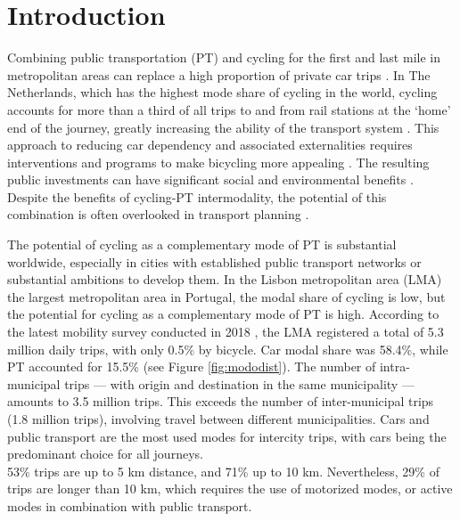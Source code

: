 \documentclass[review, doubleblind, 3p,
authoryear]{elsarticle} %
\begin{document}
\hypersetup{citecolor=black}

\section{Introduction}\label{introduction}

Combining public transportation (PT) and cycling for the first and last
mile in metropolitan areas can replace a high proportion of private car
trips \citep{MARTENS2007326}. In The Netherlands, which has the highest
mode share of cycling in the world, cycling accounts for more than a
third of all trips to and from rail stations at the `home' end of the
journey, greatly increasing the ability of the transport system
\citep{RIETVELD200071}. This approach to reducing car dependency and
associated externalities requires interventions and programs to make
bicycling more appealing \citep{lapaix_role_2021}. The resulting public
investments can have significant social and environmental benefits
\citep{internationaltransportforum_integrating_2017}. Despite the
benefits of cycling-PT intermodality, the potential of this combination
is often overlooked in transport planning \citep{lapaix_role_2021}.

The potential of cycling as a complementary mode of PT is substantial
worldwide, especially in cities with established public transport
networks or substantial ambitions to develop them. In the Lisbon
metropolitan area (LMA) the largest metropolitan area in Portugal, the
modal share of cycling is low, but the potential for cycling as a
complementary mode of PT is high. According to the latest mobility
survey conducted in 2018 \citep{IMOB}, the LMA registered a total of 5.3
million daily trips, with only 0.5\% by bicycle. Car modal share was
58.4\%, while PT accounted for 15.5\% (see Figure \ref{fig:mododist}).
The number of intra-municipal trips --- with origin and destination in
the same municipality --- amounts to 3.5 million trips. This exceeds the
number of inter-municipal trips (1.8 million trips), involving travel
between different municipalities. Cars and public transport are the most
used modes for intercity trips, with cars being the predominant choice
for all journeys.\\
53\% trips are up to 5 km distance, and 71\% up to 10 km. Nevertheless,
29\% of trips are longer than 10 km, which requires the use of motorized
modes, or active modes in combination with public transport.
\end{document}
